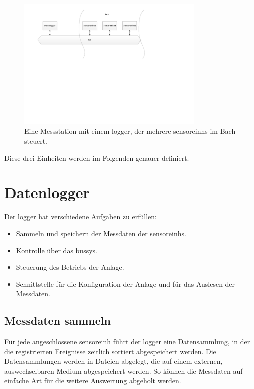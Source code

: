 \begin{figure}[H]
	\centering
		\includegraphics[width=0.8\textwidth]{images/visio/situationskroki.pdf}
	\caption{Eine Messstation mit einem \gls{logger}, der mehrere \glspl{sensoreinh} im Bach steuert.}
	\label{fig.situationskroki}
\end{figure}



Diese drei Einheiten werden im Folgenden genauer definiert.

\section{Datenlogger}
Der \gls{logger} hat verschiedene Aufgaben zu erfüllen:
\begin{itemize}
\item Sammeln und speichern der Messdaten der \glspl{sensoreinh}.
\item Kontrolle über das \gls{bussys}.
\item Steuerung des Betriebs der Anlage.
\item Schnittstelle für die Konfiguration der Anlage und für das Auslesen der Messdaten.
\end{itemize}


\subsection{Messdaten sammeln}
Für jede angeschlossene \gls{sensoreinh} führt der \gls{logger} eine Datensammlung, in der die registrierten Ereignisse zeitlich sortiert abgespeichert werden. Die Datensammlungen werden in Dateien abgelegt, die auf einem externen, auswechselbaren Medium abgespeichert werden. So können die Messdaten auf einfache Art für die weitere Auswertung abgeholt werden.


